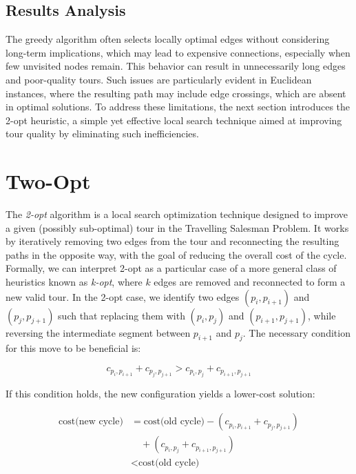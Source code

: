 \subsection{Results Analysis}

The greedy algorithm often selects locally optimal edges without considering long-term implications, which may lead to expensive connections, 
especially when few unvisited nodes remain. This behavior can result in unnecessarily long edges and poor-quality tours. Such issues are particularly 
evident in Euclidean instances, where the resulting path may include edge crossings, which are absent in optimal solutions. To address these limitations, 
the next section introduces the 2-opt heuristic, a simple yet effective local search technique aimed at improving tour quality by eliminating such inefficiencies.

\newpage

\section{Two-Opt}

The \textit{2-opt} algorithm is a local search optimization technique designed to improve a given (possibly sub-optimal) tour 
in the Travelling Salesman Problem. It works by iteratively removing two edges from the tour and reconnecting the resulting paths 
in the opposite way, with the goal of reducing the overall cost of the cycle.
Formally, we can interpret 2-opt as a particular case of a more general class of heuristics known as \textit{k-opt}, 
where $k$ edges are removed and reconnected to form a new valid tour. In the 2-opt case, we identify two edges $(p_i, p_{i+1})$ 
and $(p_j, p_{j+1})$ such that replacing them with $(p_i, p_j)$ and $(p_{i+1}, p_{j+1})$, while reversing the intermediate segment between $p_{i+1}$ and $p_j$. 
The necessary condition for this move to be beneficial is:

\begin{equation}
    c_{p_i,p_{i+1}} + c_{p_j,p_{j+1}} > c_{p_i,p_j} + c_{p_{i+1},p_{j+1}}
\end{equation}

If this condition holds, the new configuration yields a lower-cost solution:

\begin{align*}
    \text{cost(new cycle)} &= \text{cost(old cycle)} - (c_{p_i,p_{i+1}} + c_{p_j,p_{j+1}}) \\
    &\quad + (c_{p_i,p_j} + c_{p_{i+1},p_{j+1}}) \\
    &< \text{cost(old cycle)}
\end{align*}

